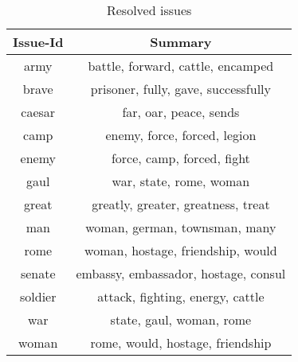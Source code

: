 \begin{table}[ht]
\caption{Resolved issues}
\centering
\begin{tabular}{@{}c c@{}}
	\toprule
	{\bfseries Issue-Id} & {\bfseries Summary} \\
	\midrule
	army & battle, forward, cattle, encamped\\ 
	brave & prisoner, fully, gave, successfully\\ 
	caesar & far, oar, peace, sends\\ 
	camp & enemy, force, forced, legion\\ 
	enemy & force, camp, forced, fight\\ 
	gaul & war, state, rome, woman\\ 
	great & greatly, greater, greatness, treat\\ 
	man & woman, german, townsman, many\\ 
	rome & woman, hostage, friendship, would\\ 
	senate & embassy, embassador, hostage, consul\\ 
	soldier & attack, fighting, energy, cattle\\ 
	war & state, gaul, woman, rome\\ 
	woman & rome, would, hostage, friendship\\
	\bottomrule
\end{tabular}
\label{table:nonlin}
\end{table}